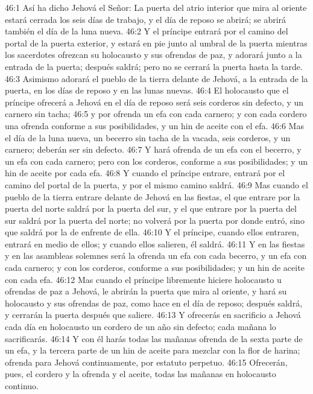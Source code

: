 46:1 Así ha dicho Jehová el Señor: La puerta del atrio interior que mira al oriente estará cerrada los seis días de trabajo, y el día de reposo se abrirá; se abrirá también el día de la luna nueva.   
46:2 Y el príncipe entrará por el camino del portal de la puerta exterior, y estará en pie junto al umbral de la puerta mientras los sacerdotes ofrezcan su holocausto y sus ofrendas de paz, y adorará junto a la entrada de la puerta; después saldrá; pero no se cerrará la puerta hasta la tarde.   
46:3 Asimismo adorará el pueblo de la tierra delante de Jehová, a la entrada de la puerta, en los días de reposo y en las lunas nuevas.   
46:4 El holocausto que el príncipe ofrecerá a Jehová en el día de reposo será seis corderos sin defecto, y un carnero sin tacha;   
46:5 y por ofrenda un efa   con cada carnero; y con cada cordero una ofrenda conforme a sus posibilidades, y un hin de aceite con el efa.   
46:6 Mas el día de la luna nueva, un becerro sin tacha de la vacada, seis corderos, y un carnero; deberán ser sin defecto.   
46:7 Y hará ofrenda de un efa   con el becerro, y un efa con cada carnero; pero con los corderos, conforme a sus posibilidades; y un hin de aceite por cada efa.   
46:8 Y cuando el príncipe entrare, entrará por el camino del portal de la puerta, y por el mismo camino saldrá.   
46:9 Mas cuando el pueblo de la tierra entrare delante de Jehová en las fiestas, el que entrare por la puerta del norte saldrá por la puerta del sur, y el que entrare por la puerta del sur saldrá por la puerta del norte; no volverá por la puerta por donde entró, sino que saldrá por la de enfrente de ella.   
46:10 Y el príncipe, cuando ellos entraren, entrará en medio de ellos; y cuando ellos salieren, él saldrá.   
46:11 Y en las fiestas y en las asambleas solemnes será la ofrenda un efa   con cada becerro, y un efa con cada carnero; y con los corderos, conforme a sus posibilidades; y un hin de aceite con cada efa.   
46:12 Mas cuando el príncipe libremente hiciere holocausto u ofrendas de paz a Jehová, le abrirán la puerta que mira al oriente, y hará su holocausto y sus ofrendas de paz, como hace en el día de reposo; después saldrá, y cerrarán la puerta después que saliere.   
46:13 Y ofrecerás en sacrificio a Jehová cada día en holocausto un cordero de un año sin defecto; cada mañana lo sacrificarás.   
46:14 Y con él harás todas las mañanas ofrenda de la sexta parte de un efa, y la tercera parte de un hin de aceite para mezclar con la flor de harina; ofrenda para Jehová continuamente, por estatuto perpetuo.   
46:15 Ofrecerán, pues, el cordero y la ofrenda y el aceite, todas las mañanas en holocausto continuo.   
